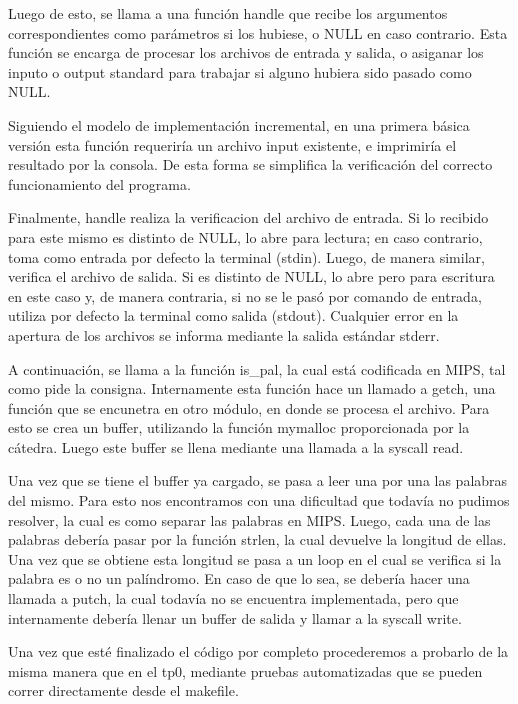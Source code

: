 \documentclass[10pt,a4paper]{article}
\begin{document}
Luego de esto, se llama a una función handle que recibe los argumentos correspondientes como parámetros si los hubiese, o NULL en caso contrario. Esta función se encarga de procesar los archivos de entrada y salida, o asiganar los inputo o output standard para trabajar si alguno hubiera sido pasado como NULL.

Siguiendo el modelo de implementación incremental, en una primera básica versión esta función requeriría un archivo input existente, e imprimiría el resultado por la consola. De esta forma se simplifica la verificación del correcto funcionamiento del programa.

Finalmente, handle realiza la verificacion del archivo de entrada. Si lo recibido para este mismo es distinto de NULL, lo abre para lectura; en caso contrario, toma como entrada por defecto la terminal (stdin). Luego, de manera similar, verifica el archivo de salida. Si es distinto de NULL, lo abre pero para escritura en este caso y, de manera contraria, si no se le pasó por comando de entrada, utiliza por defecto la terminal como salida (stdout). Cualquier error en la apertura de los archivos se informa mediante la salida estándar stderr.

A continuación, se llama a la función is_pal, la cual está codificada en MIPS, tal como pide la consigna. Internamente esta función hace un llamado a getch, una función que se encunetra en otro módulo, en donde se procesa el archivo. Para esto se crea un buffer, utilizando la función mymalloc proporcionada por la cátedra. Luego este buffer se llena mediante una llamada a la syscall read.

Una vez que se tiene el buffer ya cargado, se pasa a leer una por una las palabras del mismo. Para esto nos encontramos con una dificultad que todavía no pudimos resolver, la cual es como separar las palabras en MIPS. Luego, cada una de las palabras debería pasar por la función strlen, la cual devuelve la longitud de ellas. Una vez que se obtiene esta longitud se pasa a un loop en el cual se verifica si la palabra es o no un palíndromo. En caso de que lo sea, se debería hacer una llamada a putch, la cual todavía no se encuentra implementada, pero que internamente debería llenar un buffer de salida y llamar a la syscall write.

Una vez que esté finalizado el código por completo procederemos a probarlo de la misma manera que en el tp0, mediante pruebas automatizadas que se pueden correr directamente desde el makefile.

\newpage
\end{document}
